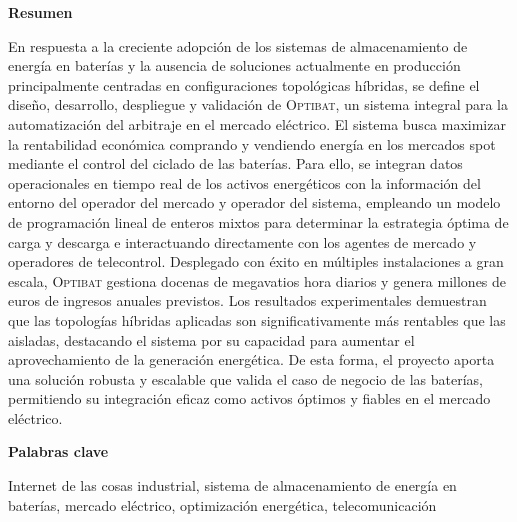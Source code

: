 \newpage

\thispagestyle{empty}

\begin{center}
  {\bf \huge Resumen}
\end{center}

\vspace{1cm}

En respuesta a la creciente adopción de los sistemas de almacenamiento de energía en baterías y la ausencia de soluciones actualmente en producción principalmente centradas en configuraciones topológicas híbridas, se define el diseño, desarrollo, despliegue y validación de \textsc{Optibat}, un sistema integral para la automatización del arbitraje en el mercado eléctrico. El sistema busca maximizar la rentabilidad económica comprando y vendiendo energía en los mercados spot mediante el control del ciclado de las baterías. Para ello, se integran datos operacionales en tiempo real de los activos energéticos con la información del entorno del operador del mercado y operador del sistema, empleando un modelo de programación lineal de enteros mixtos para determinar la estrategia óptima de carga y descarga e interactuando directamente con los agentes de mercado y operadores de telecontrol. Desplegado con éxito en múltiples instalaciones a gran escala, \textsc{Optibat} gestiona docenas de megavatios hora diarios y genera millones de euros de ingresos anuales previstos. Los resultados experimentales demuestran que las topologías híbridas aplicadas son significativamente más rentables que las aisladas, destacando el sistema por su capacidad para aumentar el aprovechamiento de la generación energética. De esta forma, el proyecto aporta una solución robusta y escalable que valida el caso de negocio de las baterías, permitiendo su integración eficaz como activos óptimos y fiables en el mercado eléctrico.

\vspace{1cm}

\begin{center}
  {\bf \large Palabras clave}
\end{center}

\vspace{0.5cm}

Internet de las cosas industrial, sistema de almacenamiento de energía en baterías, mercado eléctrico, optimización energética, telecomunicación

\newpage

\thispagestyle{empty}

